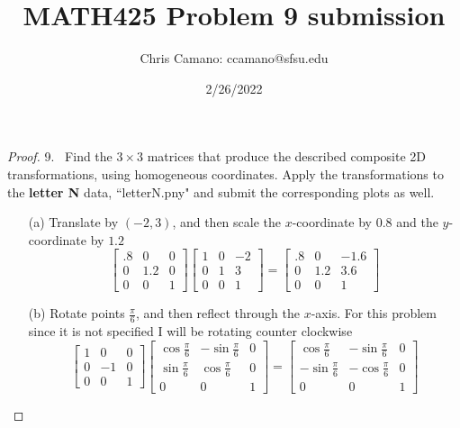 \documentclass[12pt]{article}
\author{Chris Camano: ccamano@sfsu.edu}
\title{MATH425  Problem 9 submission}
\date{2/26/2022}
\begin{document}
\maketitle
\begin{proof}
  9.~  Find the $ 3 \times 3$ matrices that produce the described composite 2D transformations, using homogeneous coordinates. Apply the transformations to the {\bf letter N} data, ``letterN.pny" and submit the corresponding plots as well.
  \begin{itemize}
  \item[(a)] Translate by $(-2, 3)$, and then scale the $x$-coordinate by $0.8$ and the $y$-coordinate by $1.2$
  \[
      \begin{bmatrix}
        .8&0&0\\
        0&1.2&0\\
        0&0&1
      \end{bmatrix}\begin{bmatrix}
        1&0&-2\\
        0&1&3\\
        0&0&1
      \end{bmatrix}=\begin{bmatrix}
        .8&0&-1.6\\
        0&1.2&3.6\\
        0&0&1
      \end{bmatrix}
  \]
  \item[(b)] Rotate points $\frac{\pi}{6}$, and then reflect through the $x$-axis.
  For this problem since it is not specified I will be rotating counter clockwise
  \[
  \renewcommand{\arraystretch}{2.5}
    \begin{bmatrix}
    1&0&0\\
          0&-1&0\\
      0&0&1
    \end{bmatrix}\begin{bmatrix}
      \cos{\frac{\pi}{6}}&-\sin{\frac{\pi}{6}}&0\\
      \sin{\frac{\pi}{6}}& \cos{\frac{\pi}{6}}&0\\
      0&0&1
    \end{bmatrix}=\begin{bmatrix}
      \cos{\frac{\pi}{6}}&-\sin{\frac{\pi}{6}}&0\\
      -\sin{\frac{\pi}{6}}& -\cos{\frac{\pi}{6}}&0\\
      0&0&1
    \end{bmatrix}
  \]
  \end{itemize}
\end{proof}
\end{document}
